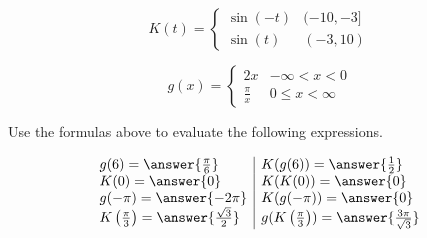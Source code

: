 \documentclass{ximera}
\author{Lee Wayand}
\begin{document}
\begin{exercise}





\[
K(t) = 
\begin{cases}
  \sin(-t) &  (-10, -3]   \\
  \sin(t) & (-3, 10)
\end{cases}
\]





\[
g(x) = 
\begin{cases}
  2x  &   -\infty < x < 0 \\
  \frac{\pi}{x} &  0 \leq x < \infty
\end{cases}
\]







Use the formulas above to evaluate the following expressions.



\[
\begin{array}{l|l}
g(6) = \answer{\frac{\pi}{6}}  & K(g(6)) = \answer{\frac{1}{2}}   \\
K(0) = \answer{0}  & K(K(0)) = \answer{0}   \\
g(-\pi) = \answer{-2 \pi}  & K(g(-\pi)) = \answer{0}   \\
K \left(\frac{\pi}{3} \right) = \answer{\frac{\sqrt{3}}{2}}  & g(K \left(\frac{\pi}{3} \right)) = \answer{\frac{3 \pi}{\sqrt{3}}}   \\

\end{array}
\]



















\end{exercise}
\end{document}
